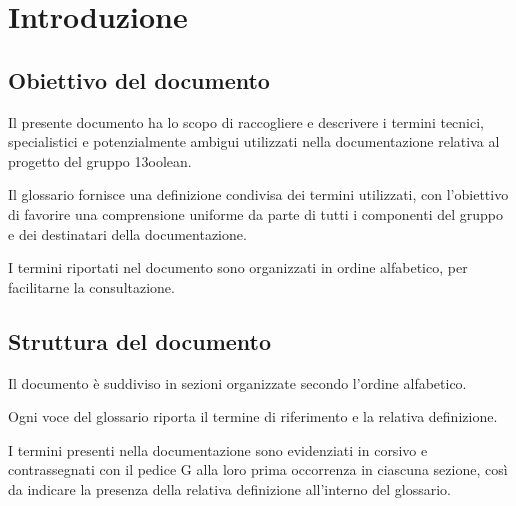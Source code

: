 \documentclass[a4paper,11pt]{article}
\begin{document}
	\section{Introduzione}

	\subsection{Obiettivo del documento}

	Il presente documento ha lo scopo di raccogliere e descrivere i termini
	tecnici, specialistici e potenzialmente ambigui utilizzati nella
	documentazione relativa al progetto del gruppo 13oolean.

	Il glossario fornisce una definizione condivisa dei termini utilizzati,
	con l'obiettivo di favorire una comprensione uniforme da parte di tutti
	i componenti del gruppo e dei destinatari della documentazione.

	I termini riportati nel documento sono organizzati in ordine alfabetico,
	per facilitarne la consultazione.

	\subsection{Struttura del documento}

	Il documento è suddiviso in sezioni organizzate secondo l'ordine
	alfabetico.

	Ogni voce del glossario riporta il termine di riferimento e la relativa
	definizione.

	I termini presenti nella documentazione sono evidenziati in corsivo
	e contrassegnati con il pedice G alla loro prima occorrenza in ciascuna
	sezione, così da indicare la presenza della relativa definizione
	all'interno del glossario.

	\clearpage

	
\end{document}
